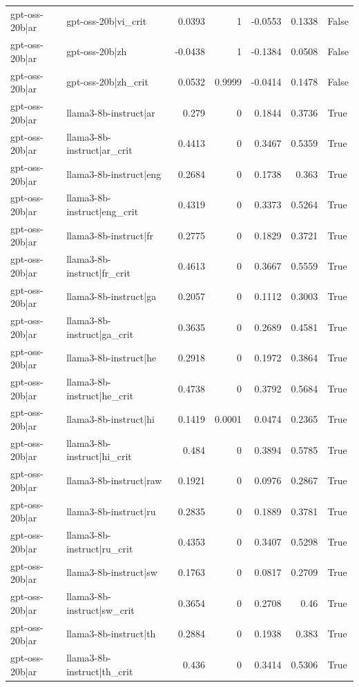 \begin{table}
\begin{tabular}{l l r r r r l}
gpt-oss-20b|ar & gpt-oss-20b|vi_crit & 0.0393 & 1 & -0.0553 & 0.1338 & False \\
gpt-oss-20b|ar & gpt-oss-20b|zh & -0.0438 & 1 & -0.1384 & 0.0508 & False \\
gpt-oss-20b|ar & gpt-oss-20b|zh_crit & 0.0532 & 0.9999 & -0.0414 & 0.1478 & False \\
gpt-oss-20b|ar & llama3-8b-instruct|ar & 0.279 & 0 & 0.1844 & 0.3736 & True \\
gpt-oss-20b|ar & llama3-8b-instruct|ar_crit & 0.4413 & 0 & 0.3467 & 0.5359 & True \\
gpt-oss-20b|ar & llama3-8b-instruct|eng & 0.2684 & 0 & 0.1738 & 0.363 & True \\
gpt-oss-20b|ar & llama3-8b-instruct|eng_crit & 0.4319 & 0 & 0.3373 & 0.5264 & True \\
gpt-oss-20b|ar & llama3-8b-instruct|fr & 0.2775 & 0 & 0.1829 & 0.3721 & True \\
gpt-oss-20b|ar & llama3-8b-instruct|fr_crit & 0.4613 & 0 & 0.3667 & 0.5559 & True \\
gpt-oss-20b|ar & llama3-8b-instruct|ga & 0.2057 & 0 & 0.1112 & 0.3003 & True \\
gpt-oss-20b|ar & llama3-8b-instruct|ga_crit & 0.3635 & 0 & 0.2689 & 0.4581 & True \\
gpt-oss-20b|ar & llama3-8b-instruct|he & 0.2918 & 0 & 0.1972 & 0.3864 & True \\
gpt-oss-20b|ar & llama3-8b-instruct|he_crit & 0.4738 & 0 & 0.3792 & 0.5684 & True \\
gpt-oss-20b|ar & llama3-8b-instruct|hi & 0.1419 & 0.0001 & 0.0474 & 0.2365 & True \\
gpt-oss-20b|ar & llama3-8b-instruct|hi_crit & 0.484 & 0 & 0.3894 & 0.5785 & True \\
gpt-oss-20b|ar & llama3-8b-instruct|raw & 0.1921 & 0 & 0.0976 & 0.2867 & True \\
gpt-oss-20b|ar & llama3-8b-instruct|ru & 0.2835 & 0 & 0.1889 & 0.3781 & True \\
gpt-oss-20b|ar & llama3-8b-instruct|ru_crit & 0.4353 & 0 & 0.3407 & 0.5298 & True \\
gpt-oss-20b|ar & llama3-8b-instruct|sw & 0.1763 & 0 & 0.0817 & 0.2709 & True \\
gpt-oss-20b|ar & llama3-8b-instruct|sw_crit & 0.3654 & 0 & 0.2708 & 0.46 & True \\
gpt-oss-20b|ar & llama3-8b-instruct|th & 0.2884 & 0 & 0.1938 & 0.383 & True \\
gpt-oss-20b|ar & llama3-8b-instruct|th_crit & 0.436 & 0 & 0.3414 & 0.5306 & True \\

\end{tabular}
\end{table}
